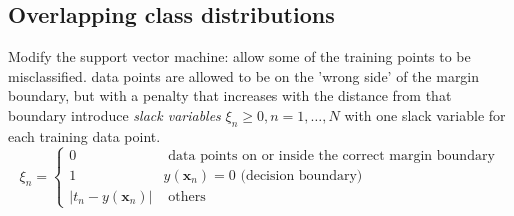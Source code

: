 \documentclass[a4paper]{article}
\begin{document}
\subsection{Overlapping class distributions}
Modify the support vector machine: allow some of the training points to be misclassiﬁed.
data points are allowed to be on the 'wrong side' of the margin
boundary, but with a penalty that increases with the distance from that boundary
introduce \textit{slack variables} $\xi_n \geq 0, n=1,\dots,N$ with
one slack variable for each training data point.
\[
\xi_n =
\begin{cases}
 0 & \text{ data points on or inside the correct margin boundary}\\
 1 & y(\mathbf{x}_n) = 0 \text{ (decision boundary)}\\
 |t_n-y(\mathbf{x}_n)| & \text{ others}
\end{cases}
\]
\end{document}
